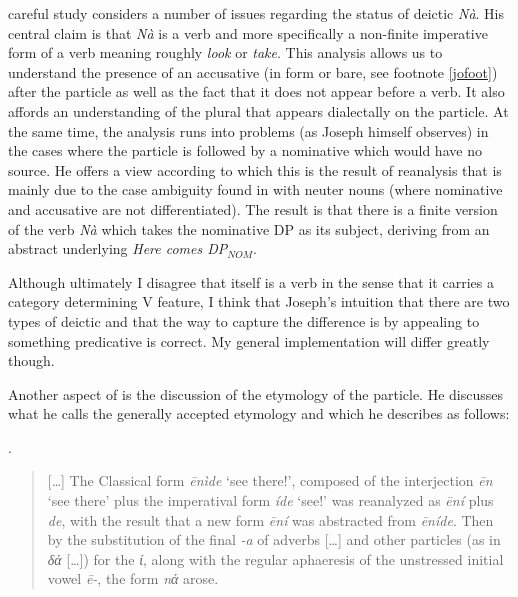 \documentclass[output=paper]{LSP/langsci}
\begin{document}
 careful study  considers a {number} of issues regarding the status of deictic \textit{N\`{a}}. His central claim is that \textit{N\`{a}} is a verb and more specifically a non-finite imperative form of a verb meaning roughly \textit{look} or \textit{take}.  This analysis allows us to understand the presence of an accusative (in   form or bare, see footnote \ref{jofoot}) after the particle as well as the fact that it does not appear before a verb. It also affords an understanding of the plural  that appears dialectally on the particle.  At the same time, the analysis runs into problems (as Joseph himself observes) in the cases where the particle is followed by a nominative which would have no source.  He offers a view according to which this is the result of reanalysis that is mainly due to the case ambiguity found in  with neuter nouns (where nominative and accusative are not differentiated).  The result is that there is a finite version of the verb \textit{N\`{a}}  which takes the nominative DP as its subject, deriving from an abstract underlying \textit{Here comes DP$_{NOM}$}.

Although ultimately I disagree that \na itself is a verb in the sense that it carries a category determining  V feature, I think that Joseph's intuition that there are two types of deictic \na and that the way to capture the difference is by appealing to something predicative is correct.  My general implementation will differ greatly though.

Another aspect of \citet{joseph:81} is the discussion of the etymology of the particle.  He discusses what he calls the generally accepted etymology \citep[due to][]{hadzidakis:05} and which he describes as follows:

\Lsciex.
\begin{quote}
 [\ldots]  The Classical  form \textit{\={e}n\`{i}de} `see there!', composed of the interjection \textit{\={e}n} `see there' plus the imperatival form \textit{\'{i}de} `see!' was reanalyzed as \textit{\={e}n\'{i}} plus \textit{de}, with the result that a new form \textit{\={e}n\'{i}} was abstracted from  \textit{\={e}n\'ide}.  Then by the substitution of the final \textit{-a} of adverbs [\ldots] and other particles (as in \textit{δά} [\ldots]) for the \textit{ί}, along with the regular aphaeresis of the unstressed initial vowel \textit{\=e-}, the form \textit{nά} arose. \citep[p.141]{joseph:81}
\end{quote}
\end{document}
